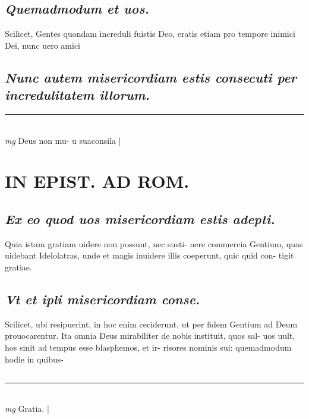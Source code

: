 \documentclass{article}
\begin{document}
\begin{pages}
\subsection*{\textit{Quemadmodum et uos. }}\pstart Scilicet, Gentes quondam increduli fuistis Deo, eratis etiam pro tempore inimici Dei, nunc uero amici  \pend
{}
{}
\subsection*{\textit{Nunc autem misericordiam estis consecuti per incredulitatem illorum. }}\pstart  \pend
\vspace{0.5cm}\noindent
\vspace{0.2cm}\rule{1cm}{0.2pt}\\ 
\hspace{0.2cm}\textit{mg}
\footnotesize Deus non mu- u suaconsila 
\normalsize| 
\section*{IN EPIST. AD ROM.  }
\marginpar{[ p.139 ]}
{}
\subsection*{\textit{Ex eo quod uos misericordiam estis adepti. }}\pstart Quia istam gratiam uidere non possunt, nec susti- nere commercia Gentium, quas uidebant Idelolatras, unde et magis inuidere illis coeperunt, quic quid con- tigit gratiae.   \pend
{}
{}
\subsection*{\textit{Vt et ipli misericordiam conse. }}\pstart Scilicet, ubi resipuerint, in hoc enim ceciderunt, ut per fidem Gentium ad Deum prouocarentur. Ita omnia Deus mirabiliter de nobis instituit, quos sal- uos uult, hos sinit ad tempus esse blasphemos, et ir- risores nominis sui: quemadmodum hodie in quibus-  \pend
{}
{}
\subsection*{\textit{}}\pstart  \pend
\vspace{0.5cm}\noindent
\vspace{0.2cm}\rule{1cm}{0.2pt}\\ 
\hspace{0.2cm}\textit{mg}
\footnotesize Gratia.  
\normalsize| 

\end{pages}
\end{document}
